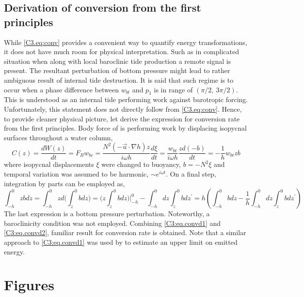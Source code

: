 \documentclass[12pt]{article}
\begin{document}
\subsection{Derivation of conversion from the first principles}
\label{C3.app:B}
While \eqref{C3.eq:conv} provides a convenient way to quantify energy transformations, it does 
not have much room for physical interpretation. Such as in complicated situation when along with 
local baroclinic tide production a remote signal is present. The resultant perturbation of bottom 
pressure might lead to rather ambiguous result of internal tide destruction. It is said that such 
regime is to occur when a phase difference between $w_{bt}$ and $p_{1}$ is in range of 
$(\pi/2,~3\pi/2)$. This is understood as an internal tide performing work against barotropic 
forcing. Unfortunately, this statement does not directly follow from \eqref{C3.eq:conv}. Hence, to 
provide cleaner physical picture, let derive the expression for conversion rate from the first 
principles. Body force of \citep{baines1982internal} is performing work by displacing isopycnal 
surfaces 
throughout a water column,
\begin{equation}
\label{C3:eq.convd1}
C(z) = \frac{dW(z)}{dt} = F_{B} w_{bc} = \frac{N^2 (-\vec{u} \cdot \nabla h) z}{i \omega h} 
\frac{d 
\xi}{dt} = \frac{w_{bt}}{i \omega h} \frac{z d(-b)}{dt} = -\frac{1}{h} w_{bt} zb
\end{equation}
where isopycnal displacements $\xi$ were changed to buoyancy, $b = -N^2 \xi$ and temporal 
variation 
was assumed to be harmonic, $\sim e^{i \omega t}$. On a final step, integration by parts can be 
employed as,
\begin{equation}
\label{C3:eq.convd2}
\int_{-h}^{0} z b dz = \int_{-h}^{0} z d \big( \int^0_{z} b dz \big) = \big( z \int^0_{z} b dz 
\big)\big|_{-h}^0 - \int_{-h}^{0} dz \int_{z}^{0} b dz^{\prime} = h (\int_{-h}^{0}b dz - 
\frac{1}{h} \int_{-h}^{0} dz \int_{z}^{0} b dz^{\prime})
\end{equation}
The last expression is a bottom pressure perturbation. Noteworthy, a baroclinicity condition was 
not employed. Combining \eqref{C3:eq.convd1} and \eqref{C3:eq.convd2}, familiar result 
for conversion rate is obtained. Note that a similar approach to \eqref{C3:eq.convd1} was used 
by \citep{nash2006structure} to estimate an upper limit on emitted energy.\\

\newpage
\section{Figures}
\end{document}
